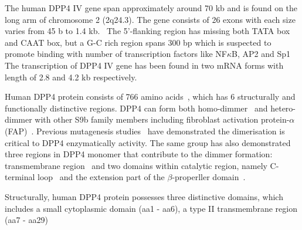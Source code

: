 The human DPP4 IV gene span approximately around 70 kb and is found on the long arm of chromosome 2 (2q24.3). The gene consists of 26 exons with each size varies from 45 b to 1.4 kb.~\cite{Abbott1994} The 5'-flanking region has missing both TATA box and CAAT box, but a G-C rich region spans 300 bp which is suspected to promote binding with number of transcription factors like NF$\kappa$B, AP2 and Sp1~\cite{Abbott1994,Böhm1995} The transcription of DPP4 IV gene has been found in two mRNA forms with length of 2.8 and 4.2 kb respectively. 
\par
Human DPP4 protein consists of 766 amino acids~\cite{Bär2003,Misumi1992}, which has 6 structurally and functionally distinctive regions. DPP4 can form both homo-dimmer~\cite{Rasmussen2003,Oefner2003,Thoma2003} and hetero-dimmer with other S9b family members including fibroblast activation protein-$\alpha$ (FAP)~\cite{Ghersi2006}. Previous mutagenesis studies~\cite{Chien_2004,Chien_2006} have demonstrated the dimerisation is critical to DPP4 enzymatically activity. The same group has also demonstrated three regions in DPP4 monomer that contribute to the dimmer formation: transmembrane region~\cite{Chung_2010} and two domains within catalytic region, namely C-terminal loop~\cite{Chien_2004} and the extension part of the $\beta$-properller domain~\cite{Chien_2006}.  
\par 
Structurally, human DPP4 protein possesses three distinctive domains, which includes a small cytoplasmic domain (aa1 - aa6), a type II transmembrane region (aa7 - aa29)